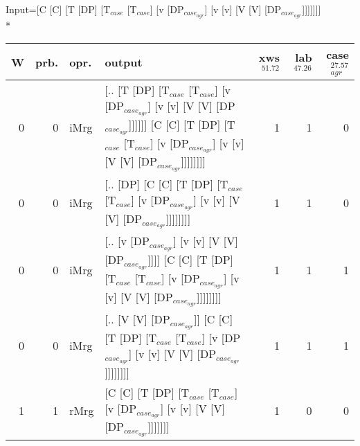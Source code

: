 \begingroup\scriptsize Input=[C [C] [T [DP] [T$_{case}$ [T$_{case}$] [v [DP$_{case_{agr}}$] [v [v] [V [V] [DP$_{case_{agr}}$]]]]]]]\\*
\begin{tabularx}{\linewidth}{rrlXrrr}
\hline
   W &   prb. & opr.   & output                                                                                                                                                             &   xws$^{51.72}$ &   lab$^{47.26}$ &   case$_{agr}^{27.57}$ \\
\hline
   0 &   0 & iMrg & [.. [T [DP] [T$_{case}$ [T$_{case}$] [v [DP$_{case_{agr}}$] [v [v] [V [V] [DP$_{case_{agr}}$]]]]]] [C [C] [T [DP] [T$_{case}$ [T$_{case}$] [v [DP$_{case_{agr}}$] [v [v] [V [V] [DP$_{case_{agr}}$]]]]]]]] &             1 &             1 &                  0 \\
   0 &   0 & iMrg & [.. [DP] [C [C] [T [DP] [T$_{case}$ [T$_{case}$] [v [DP$_{case_{agr}}$] [v [v] [V [V] [DP$_{case_{agr}}$]]]]]]]]                                                                       &             1 &             1 &                  0 \\
   0 &   0 & iMrg & [.. [v [DP$_{case_{agr}}$] [v [v] [V [V] [DP$_{case_{agr}}$]]]] [C [C] [T [DP] [T$_{case}$ [T$_{case}$] [v [DP$_{case_{agr}}$] [v [v] [V [V] [DP$_{case_{agr}}$]]]]]]]]                            &             1 &             1 &                  1 \\
   0 &   0 & iMrg & [.. [V [V] [DP$_{case_{agr}}$]] [C [C] [T [DP] [T$_{case}$ [T$_{case}$] [v [DP$_{case_{agr}}$] [v [v] [V [V] [DP$_{case_{agr}}$]]]]]]]]                                                      &             1 &             1 &                  1 \\
   1 &   1 & rMrg & [C [C] [T [DP] [T$_{case}$ [T$_{case}$] [v [DP$_{case_{agr}}$] [v [v] [V [V] [DP$_{case_{agr}}$]]]]]]]                                                                                 &             1 &             0 &                  0 \\
\hline
\end{tabularx}\endgroup\\
